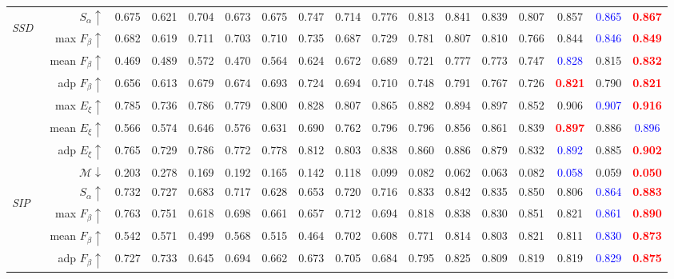 \documentclass[journal]{IEEEtran}
\newcommand{\trb}[1]{\textbf{\textcolor{red}{#1}}}
\newcommand{\tbb}[1]{\textcolor{blue}{#1}}
\newcommand{\SSD}{\textit{SSD}~\cite{zhu2017three}}
\newcommand{\SIP}{\textit{SIP}~\cite{fan2019D3Net}}
\begin{document}
\begin{table*}[t!]
\begin{tabular}{lr|ccccc|ccccccccc|c}
		\midrule
		\multirow{8}{*}{\begin{sideways}\SSD\end{sideways}}
		& $S_{\alpha}\uparrow$    & 0.675 & 0.621 & 0.704 & 0.673 & 0.675 & 0.747 & 0.714 & 0.776 & 0.813 & 0.841 & 0.839 & 0.807 & 0.857 & \tbb{0.865} & \trb{0.867} \\
		& max $F_{\beta}\uparrow$     & 0.682 & 0.619 & 0.711 & 0.703 & 0.710 & 0.735 & 0.687 & 0.729 & 0.781 & 0.807 & 0.810 & 0.766 & 0.844 & \tbb{0.846} & \trb{0.849} \\
		& mean $F_{\beta}\uparrow$     & 0.469 & 0.489 & 0.572 & 0.470 & 0.564 & 0.624 & 0.672 & 0.689 & 0.721 & 0.777 & 0.773 & 0.747 & \tbb{0.828} & 0.815 & \trb{0.832} \\
		& adp $F_{\beta}\uparrow$     & 0.656 & 0.613 & 0.679 & 0.674 & 0.693 & 0.724 & 0.694 & 0.710 & 0.748 & 0.791 & 0.767 & 0.726 & \trb{0.821} & 0.790 & \trb{0.821} \\
		& max $E_{\xi}\uparrow$       & 0.785 & 0.736 & 0.786 & 0.779 & 0.800 & 0.828 & 0.807 & 0.865 & 0.882 & 0.894 & 0.897 & 0.852 & 0.906 & \tbb{0.907} & \trb{0.916} \\
		& mean $E_{\xi}\uparrow$     & 0.566 & 0.574 & 0.646 & 0.576 & 0.631 & 0.690 & 0.762 & 0.796 & 0.796 & 0.856 & 0.861 & 0.839 & \trb{0.897} & 0.886 & \tbb{0.896} \\
		& adp $E_{\xi}\uparrow$     & 0.765 & 0.729 & 0.786 & 0.772 & 0.778 & 0.812 & 0.803 & 0.838 & 0.860 & 0.886 & 0.879 & 0.832 & \tbb{0.892} & 0.885 & \trb{0.902} \\
		& $\mathcal{M}\downarrow$ & 0.203 & 0.278 & 0.169 & 0.192 & 0.165 & 0.142 & 0.118 & 0.099 & 0.082 & 0.062 & 0.063 & 0.082 & \tbb{0.058} & 0.059 & \trb{0.050} \\
		\midrule
		\multirow{8}{*}{\begin{sideways}\SIP\end{sideways}}
		& $S_{\alpha}\uparrow$    & 0.732 & 0.727 & 0.683 & 0.717 & 0.628 & 0.653 & 0.720 & 0.716 & 0.833 & 0.842 & 0.835 & 0.850 & 0.806 & \tbb{0.864} & \trb{0.883} \\
		& max $F_{\beta}\uparrow$     & 0.763 & 0.751 & 0.618 & 0.698 & 0.661 & 0.657 & 0.712 & 0.694 & 0.818 & 0.838 & 0.830 & 0.851 & 0.821 & \tbb{0.861} & \trb{0.890} \\
		& mean $F_{\beta}\uparrow$     & 0.542 & 0.571 & 0.499 & 0.568 & 0.515 & 0.464 & 0.702 & 0.608 & 0.771 & 0.814 & 0.803 & 0.821 & 0.811 & \tbb{0.830} & \trb{0.873} \\
		& adp $F_{\beta}\uparrow$     & 0.727 & 0.733 & 0.645 & 0.694 & 0.662 & 0.673 & 0.705 & 0.684 & 0.795 & 0.825 & 0.809 & 0.819 & 0.819 & \tbb{0.829} & \trb{0.875} \\

\end{tabular}
\end{table*}
\end{document}

